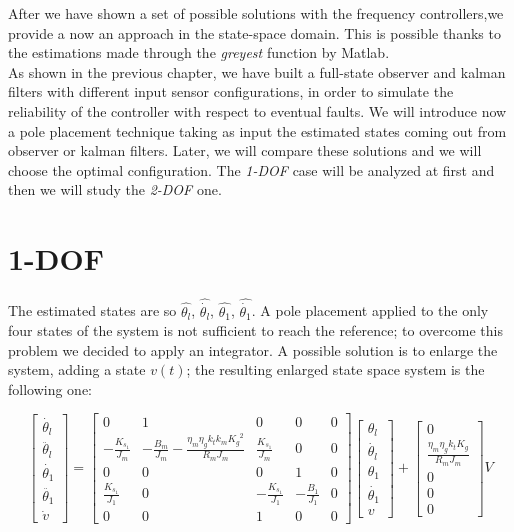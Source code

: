 After we have shown a set of possible solutions with the frequency controllers,we provide a now an approach in the state-space domain. This is possible thanks to the estimations made through the \textit{greyest} function by Matlab.\\
As shown in the previous chapter, we have built a full-state observer and kalman filters with different input sensor configurations, in order to simulate the reliability of the controller with respect to eventual faults. We will introduce now a pole placement technique taking as input the estimated states coming out from observer or kalman filters. Later, we will compare these solutions and we will choose the optimal configuration. The \textit{1-DOF} case will be analyzed at first and then we will study the \textit{2-DOF} one.

\section{1-DOF}
The estimated states are so $\hat{\theta_{l}}$, $\hat{\dot{\theta_{l}}}$, $\hat{\theta_{1}}$,  $\hat{\dot{\theta_{1}}}$. 
A pole placement applied to the only four states of the system is not sufficient to reach the reference; to overcome this problem we decided to apply an integrator. A possible solution is to enlarge the system, adding a state $v(t)$; the resulting enlarged state space system is the following one:

\begin{equation}
	\begin{bmatrix}
		\dot{\theta_l} \\
		\ddot{\theta_l} \\
		\dot{\theta_1} \\
		\ddot{\theta_1} \\
		\dot{v}
	\end{bmatrix}
	=
	\begin{bmatrix}
		0 &1 & 0 & 0 & 0 \\
		-\frac{K_{s_1}}{J_m} & -\frac{B_m}{J_m}-\frac{\eta_m \eta_g k_t k_m {K_g}^2}{R_m J_m}  & \frac{K_{s_1}}{J_m} & 0 & 0 \\
		0 & 0 & 0 & 1 & 0 \\
		\frac{K_{s_1}}{J_1} & 0 & -\frac{K_{s_1}}{J_1} & -\frac{B_1}{J_1} & 0 \\
		0 & 0 & 1 & 0 & 0 
	\end{bmatrix}
	\begin{bmatrix}
		\theta_l \\
		\dot{\theta_l} \\
		\theta_1 \\
		\dot{\theta_1} \\
		v
	\end{bmatrix}
	+
	\begin{bmatrix}
		0 \\
		\frac{\eta_m \eta_g k_t K_g}{R_m J_m} \\
		0 \\
		0 \\
		0
	\end{bmatrix}
	V
\end{equation}



